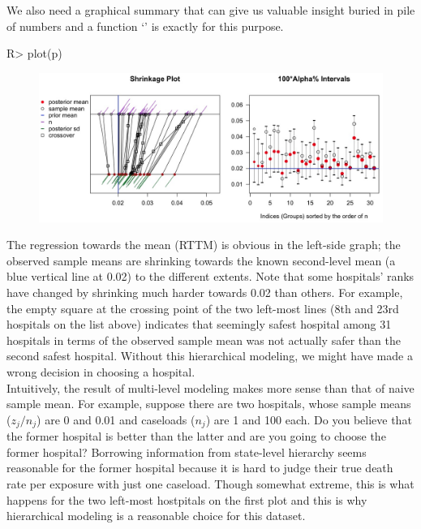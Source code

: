 \documentclass[article]{jss}
\begin{document}
We also need a graphical summary that can give us valuable insight buried in pile of numbers and a function `' is exactly for this purpose.
\begin{CodeChunk}
\begin{CodeInput}
R> plot(p)
\end{CodeInput}
\end{CodeChunk}
\begin{figure}[h]
\begin{center}
\includegraphics[scale=0.3]{hospital1.png}
\end{center}
\end{figure}
The regression towards the mean (RTTM) is obvious in the left-side graph; the observed sample means are shrinking towards the known second-level mean (a blue vertical line at 0.02) to the different extents. Note that some hospitals' ranks have changed by shrinking much harder towards 0.02 than others. For example, the empty square at the crossing point of the two left-most lines (8th and 23rd hospitals on the list above) indicates that seemingly safest hospital among 31 hospitals in terms of the observed sample mean was not actually safer than the second safest hospital. Without this hierarchical modeling, we might have made a wrong decision in choosing a hospital.
\\

Intuitively, the result of multi-level modeling makes more sense than that of naive sample mean. For example, suppose there are two hospitals, whose sample means ($z_{j} / n_{j}$) are 0 and 0.01 and caseloads ($n_{j}$) are 1 and 100 each. Do you believe that the former hospital is better than the latter and are you going to choose the former hospital? Borrowing information from state-level hierarchy seems reasonable for the former hospital because it is hard to judge their true death rate per exposure with just one caseload. Though somewhat extreme, this is what happens for the two left-most hostpitals on the first plot and this is why hierarchical modeling is a reasonable choice for this dataset.
\\
\end{document}
